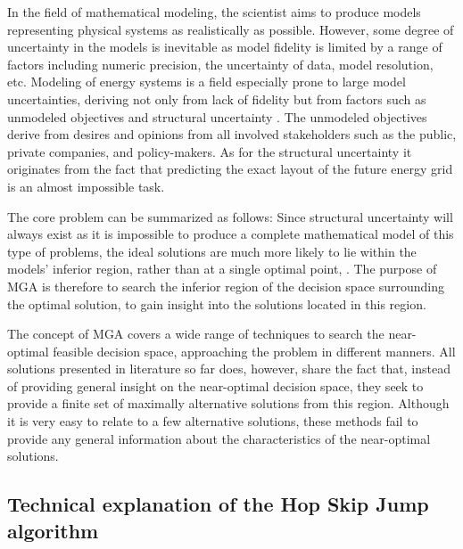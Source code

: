 In the field of mathematical modeling, the scientist aims to produce models representing physical systems as realistically as possible. However, some degree of uncertainty in the models is inevitable as model fidelity is limited by a range of factors including numeric precision, the uncertainty of data, model resolution, etc. Modeling of energy systems is a field especially prone to large model uncertainties, deriving not only from lack of fidelity but from factors such as unmodeled objectives and structural uncertainty \cite{DeCarolis_MGA}. The unmodeled objectives derive from desires and opinions from all involved stakeholders such as the public, private companies, and policy-makers. As for the structural uncertainty it originates from the fact that predicting the exact layout of the future energy grid is an almost impossible task. 


The core problem can be summarized as follows: Since structural uncertainty will always exist as it is impossible to produce a complete mathematical model of this type of problems, the ideal solutions are much more likely to lie within the models' inferior region, rather than at a single optimal point, \cite{Brill_MGA_1982}. 
The purpose of MGA is therefore to search the inferior region of the decision space surrounding the optimal solution, to gain insight into the solutions located in this region. 

The concept of MGA covers a wide range of techniques to search the near-optimal feasible decision space, approaching the problem in different manners. All solutions presented in literature so far does, however, share the fact that, instead of providing general insight on the near-optimal decision space, they seek to provide a finite set of maximally alternative solutions from this region. Although it is very easy to relate to a few alternative solutions, these methods fail to provide any general information about the characteristics of the near-optimal solutions. 



\subsection{Technical explanation of the Hop Skip Jump algorithm}


